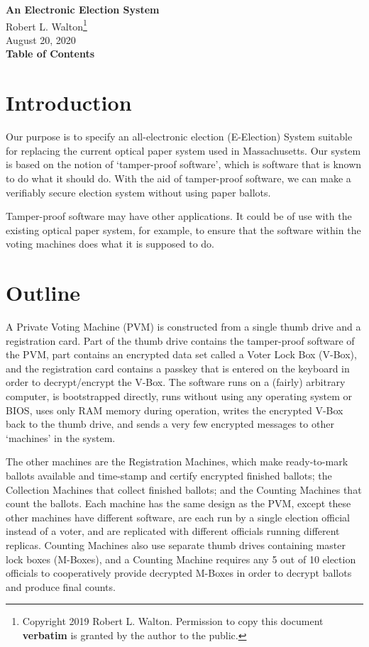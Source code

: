 \documentclass[12pt]{article}
\makeatletter
\renewcommand\tableofcontents{%
    \begin{list}{}%
	     {\setlength{\itemsep}{0in}%
	      \setlength{\topsep}{0in}%
	      \setlength{\parsep}{1ex}%
	      \setlength{\labelwidth}{0in}%
	      \setlength{\baselineskip}{1.5ex}%
	      \setlength{\leftmargin}{0.8in}%
	      \setlength{\rightmargin}{0.8in}}%
    \item\@starttoc{toc}%
    \end{list}}
\makeatother
\begin{document}
        
\begin{center}
\Large
{\LARGE  \bf An Electronic Election System}
\\[2ex]
\renewcommand{\thefootnote}{\fnsymbol{footnote}}
Robert L. Walton\footnote[1]{Copyright 2019 Robert L. Walton.
Permission to copy this document {\bf verbatim} is granted by the author
to the public.}
\\[2ex]
August 20, 2020
\\[2ex]
{\bf Table of Contents}
\end{center}

\bigskip

\tableofcontents 

\newpage

\section{Introduction}

Our purpose is to specify an all-electronic election (E-Election) System
suitable for replacing the current optical paper system
used in Massachusetts.  Our system is based on the notion
of `tamper-proof software', which is software that is
known to do what it should do.  With the aid of tamper-proof
software, we can make a verifiably secure election system without
using paper ballots.

Tamper-proof software may have other applications.
It could be of use with the existing optical paper system,
for example, to ensure that the software within the voting
machines does what it is supposed to do.

\section{Outline}

A Private Voting Machine
(PVM) is constructed from a single thumb drive and a
registration card.  Part of the thumb drive contains the
tamper-proof software of the PVM, part contains an encrypted
data set called a Voter Lock Box (V-Box), and the registration
card contains a passkey that is entered on the keyboard in
order to decrypt/encrypt the V-Box.  The software runs on
a (fairly) arbitrary computer, is bootstrapped directly,
runs without using any operating system or BIOS,
uses only RAM memory during operation,
writes the encrypted V-Box back to the thumb drive, and sends
a very few encrypted messages to other `machines' in the
system.

The other machines are the Registration Machines, which make
ready-to-mark ballots available and time-stamp and certify
encrypted finished ballots; the Collection Machines that collect
finished ballots; and the Counting Machines that count the
ballots.  Each machine has the same design as the PVM, except
these other machines have different software,
are each run by a single election official instead of a voter, and
are replicated with different officials running different
replicas.  Counting Machines also use separate
thumb drives containing master lock boxes
(M-Boxes), and a Counting Machine requires
any 5 out of 10 election officials to cooperatively
provide decrypted M-Boxes in order to decrypt ballots and
produce final counts.
\end{document}
